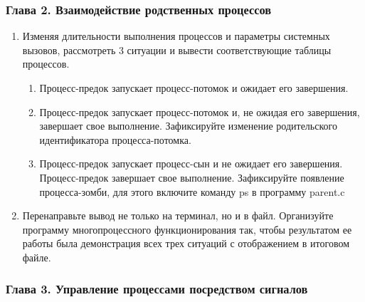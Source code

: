 \documentclass[14pt,a4paper,report]{report}
\begin{document}
\subsubsection{Глава 2. Взаимодействие родственных процессов}

\begin{enumerate}
	\item Изменяя длительности выполнения процессов и параметры системных вызовов, рассмотреть 3 ситуации и вывести соответствующие таблицы процессов.
	\begin{enumerate}
		\item Процесс-предок запускает процесс-потомок и ожидает его завершения.
		\item Процесс-предок запускает процесс-потомок и, не ожидая его завершения, завершает свое выполнение. Зафиксируйте изменение родительского идентификатора процесса-потомка.
		\item Процесс-предок запускает процесс-сын и не ожидает его завершения. Процесс-предок завершает свое выполнение. Зафиксируйте появление процесса-зомби, для этого включите команду ps в программу parent.c
	\end{enumerate}
	\item Перенаправьте вывод не только на терминал, но и в файл. Организуйте программу многопроцессного функционирования так, чтобы результатом ее работы была демонстрация всех трех ситуаций с отображением в итоговом файле.
\end{enumerate}

\subsubsection{Глава 3. Управление процессами посредством сигналов}
\end{document}
